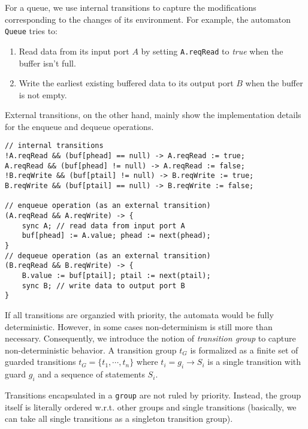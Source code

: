 \begin{example} For a queue, we use internal transitions to capture the modifications corresponding to the changes of its environment. For example, the automaton \texttt{Queue}  tries to:
\begin{enumerate}
    \item Read data from its input port $A$ by setting \texttt{A.reqRead} to \emph{true} when the buffer isn't full.
    \item Write the earliest existing buffered data to its output port $B$ when the buffer is not empty. 
\end{enumerate}
External transitions, on the other hand, mainly show the implementation details for the enqueue and dequeue operations.
\begin{lstlisting}
// internal transitions
!A.reqRead && (buf[phead] == null) -> A.reqRead := true;
A.reqRead && (buf[phead] != null) -> A.reqRead := false;
!B.reqWrite && (buf[ptail] != null) -> B.reqWrite := true;
B.reqWrite && (buf[ptail] == null) -> B.reqWrite := false;

// enqueue operation (as an external transition)
(A.reqRead && A.reqWrite) -> {
    sync A; // read data from input port A
    buf[phead] := A.value; phead := next(phead);
}
// dequeue operation (as an external transition)
(B.reqRead && B.reqWrite) -> {
    B.value := buf[ptail]; ptail := next(ptail);
    sync B; // write data to output port B
}
\end{lstlisting}
\label{exp:trans_queue}
\end{example}

If all transitions are organzied with priority, the automata would be fully deterministic. However, in some cases non-determinism is still more than necessary. Consequently, we introduce the notion of \emph{transition group} to capture non-deterministic behavior. A transition group $t_G$ is formalized as a finite set of guarded transitions
$t_G=\{t_1,\cdots, t_n\}$ where $t_i=g_i\rightarrow S_i$ is a single transition with guard $g_i$ and a sequence of statements $S_i$.

Transitions encapsulated in a \texttt{group} are not ruled by priority. Instead, the group itself is literally ordered w.r.t. other groups and single transitions (basically, we can take all single transitions as a singleton transition group).

